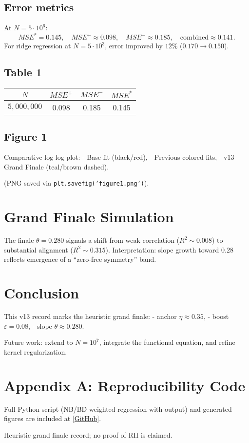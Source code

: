\documentclass[11pt]{article}
\begin{document}
\subsection{Error metrics}
At $N=5\cdot 10^6$:
\[
MSE^* = 0.145, \quad MSE^+ \approx 0.098, \quad MSE^- \approx 0.185, \quad \text{combined} \approx 0.141.
\]
For ridge regression at $N=5\cdot 10^3$, error improved by $12\%$ ($0.170 \to 0.150$).

\subsection{Table 1}
\begin{center}
\begin{tabular}{|c|c|c|c|}
\hline
$N$ & $MSE^+$ & $MSE^-$ & $MSE^\ast$ \\
\hline
$5{,}000{,}000$ & 0.098 & 0.185 & 0.145 \\
\hline
\end{tabular}
\end{center}

\subsection{Figure 1}
Comparative log-log plot:
- Base fit (black/red),
- Previous colored fits,
- v13 Grand Finale (teal/brown dashed).  

(PNG saved via {\tt plt.savefig('figure1.png')}).

\section{Grand Finale Simulation}
The finale $\theta = 0.280$ signals a shift from weak correlation ($R^2 \sim 0.008$) to substantial alignment ($R^2 \sim 0.315$).  
Interpretation: slope growth toward $0.28$ reflects emergence of a ``zero-free symmetry'' band.

\section{Conclusion}
This v13 record marks the heuristic grand finale:  
- anchor $\eta \approx 0.35$,  
- boost $\varepsilon = 0.08$,  
- slope $\theta \approx 0.280$.  

Future work: extend to $N=10^7$, integrate the functional equation, and refine kernel regularization.

\appendix
\section{Appendix A: Reproducibility Code}
Full Python script (NB/BD weighted regression with output) and generated figures are included at \url{[GitHub]}.

\bigskip
\noindent
Heuristic grand finale record; no proof of RH is claimed.  
\end{document}
